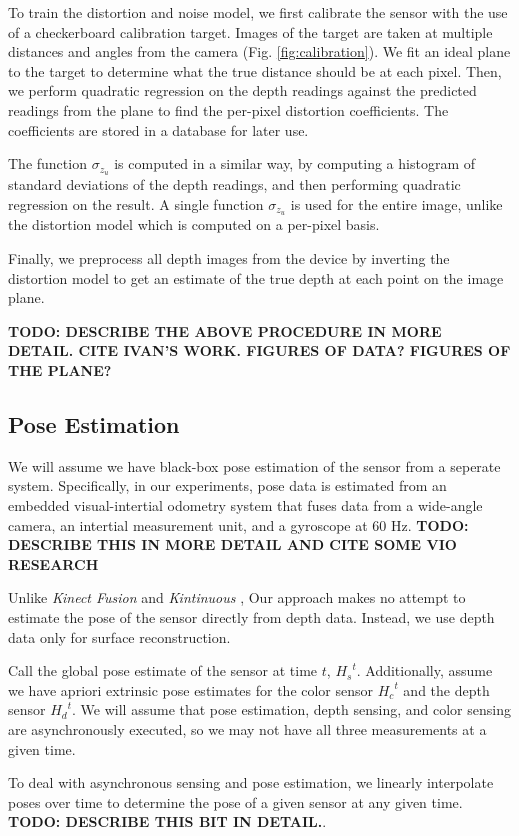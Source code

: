 \documentclass[conference,10pt]{IEEEtran}
\begin{document}
 To train the distortion and noise model, we first calibrate the sensor with the
 use of a checkerboard calibration target. Images of the target are taken at
 multiple distances and angles from the camera (Fig. \ref{fig:calibration}). We
 fit an ideal plane to the target to determine what the true distance should be
 at each pixel. Then, we perform quadratic regression on the depth readings
 against the predicted readings from the plane to find the per-pixel distortion
 coefficients. The coefficients are stored in a database for later use.

The function $\sigma_{z_u}$ is computed in a similar way, by computing a
histogram of standard deviations of the depth readings, and then performing
quadratic regression on the result. A single function $\sigma_{z_u}$ is used for
the entire image, unlike the distortion model which is computed on a per-pixel
basis.

Finally, we preprocess all depth images from the device by inverting the
distortion model to get an estimate of the true depth at each point on the
image plane.

\textbf{TODO: DESCRIBE THE ABOVE PROCEDURE IN MORE DETAIL. CITE IVAN'S WORK.
FIGURES OF DATA? FIGURES OF THE PLANE?}

\subsection{Pose Estimation}
We will assume we have black-box pose estimation of the sensor from a seperate
system. Specifically, in our experiments, pose data is estimated from an
embedded visual-intertial odometry system that fuses data from a wide-angle camera, an
intertial measurement unit, and a gyroscope at 60 Hz. \textbf{TODO: DESCRIBE
THIS IN MORE DETAIL AND CITE SOME VIO RESEARCH}

Unlike \textit{Kinect Fusion} \cite{Newcombe} and \textit{Kintinuous}
\cite{Whelan2013}, Our approach makes no attempt to estimate the pose of the
sensor directly from depth data. Instead, we use depth data only for surface
reconstruction.

Call the global pose estimate of the sensor at time $t$,  ${H_{s}}^t$.
Additionally, assume we have apriori extrinsic pose estimates for the color
sensor ${H_{c}}^t$ and the depth sensor ${H_{d}}^t$. We will assume that pose
estimation, depth sensing, and color sensing are asynchronously executed, so we
may not have all three measurements at a given time.

To deal with asynchronous sensing and pose estimation, we linearly interpolate
poses over time to determine the pose of a given sensor at any given time.
\textbf{TODO: DESCRIBE THIS BIT IN DETAIL.}.
\end{document}
